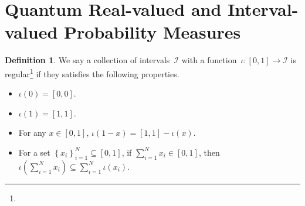 \documentclass[12pt]{iopart}
\theoremstyle{plain}
\theoremstyle{definition}
\newtheorem{definition}[thm]{Definition}
\newcommand{\yutsung}[1]{\fbox{\begin{minipage}{0.9\textwidth}\color{purple}{Yu-Tsung says: #1}\end{minipage}}}
\begin{document}
\section{Quantum Real-valued and Interval-valued Probability Measures\label{sec:Real-and-Interval}}

\begin{definition}We say a collection of intervals~$\mathscr{I}$
with a function~$\iota:\left[0,1\right]\rightarrow\mathscr{I}$ is
regular\footnote{\yutsung{''regular'' is just a random name pop into my mind...}}
if they satisfies the following properties.
\begin{itemize}
\item $\iota\left(0\right)=\left[0,0\right]$.
\item $\iota\left(1\right)=\left[1,1\right]$. 
\item For any $x\in\left[0,1\right]$, $\iota\left(1-x\right)=\left[1,1\right]-\iota\left(x\right)$.
\item For a set $\left\{ x_{i}\right\} _{i=1}^{N}\subseteq\left[0,1\right]$,
if $\sum_{i=1}^{N}x_{i}\in\left[0,1\right]$, then $\iota\left(\sum_{i=1}^{N}x_{i}\right)\subseteq\sum_{i=1}^{N}\iota\left(x_{i}\right)$.
\end{itemize}
\end{definition}
\end{document}
